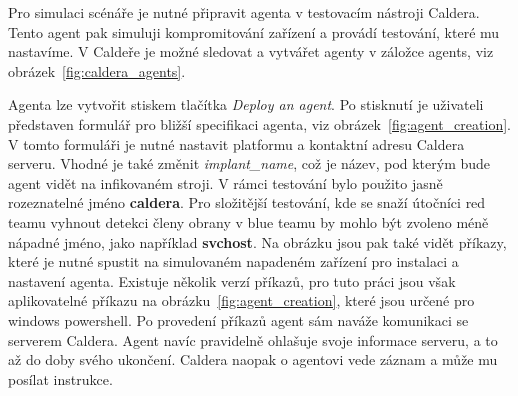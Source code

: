 Pro simulaci scénáře je nutné připravit agenta v testovacím nástroji Caldera.
Tento agent pak simuluji kompromitování zařízení a provádí testování, které mu nastavíme.
V Caldeře je možné sledovat a vytvářet agenty v záložce agents, viz obrázek~\ref{fig:caldera_agents}.

Agenta lze vytvořit stiskem tlačítka \textit{Deploy an agent}.
Po stisknutí je uživateli představen formulář pro bližší specifikaci agenta, viz obrázek~\ref{fig:agent_creation}.
V tomto formuláři je nutné nastavit platformu a kontaktní adresu Caldera serveru.
Vhodné je také změnit \textit{implant\_name}, což je název, pod kterým bude agent vidět na infikovaném stroji.
V rámci testování bylo použito jasně rozeznatelné jméno \textbf{caldera}.
Pro složitější testování, kde se snaží útočníci red teamu vyhnout detekci členy obrany v blue teamu by mohlo být zvoleno méně nápadné jméno, jako například \textbf{svchost}.
Na obrázku jsou pak také vidět příkazy, které je nutné spustit na simulovaném napadeném zařízení pro instalaci a nastavení agenta.
Existuje několik verzí příkazů, pro tuto práci jsou však aplikovatelné příkazu na obrázku~\ref{fig:agent_creation}, které jsou určené pro windows powershell.
Po provedení příkazů agent sám naváže komunikaci se serverem Caldera.
Agent navíc pravidelně ohlašuje svoje informace serveru, a to až do doby svého ukončení.
Caldera naopak o agentovi vede záznam a může mu posílat instrukce.


